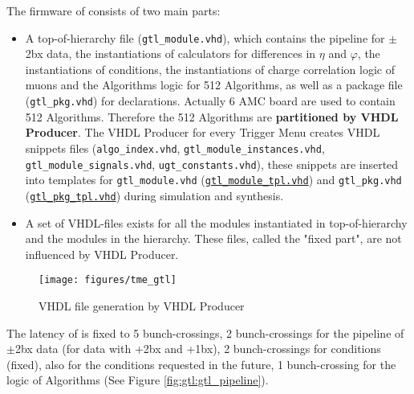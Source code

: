 The firmware of \ugtl consists of two main parts:
\begin{itemize}
\item A top-of-hierarchy file (\texttt{gtl\_module.vhd}), which contains the pipeline for $\pm$2bx data, the instantiations of calculators for differences in $\eta$ and $\varphi$, the instantiations of conditions, the instantiations of charge correlation logic of muons and the Algorithms logic for 512 Algorithms, as well as a package file (\texttt{gtl\_pkg.vhd}) for declarations. 
Actually 6 AMC board are used to contain 512 Algorithms. Therefore the 512 Algorithms are \textbf{partitioned by VHDL Producer}.
The VHDL Producer for every Trigger Menu creates VHDL snippets files (\texttt{algo\_index.vhd}, \texttt{gtl\_module\_instances.vhd}, \texttt{gtl\_module\_signals.vhd}, \texttt{ugt\_constants.vhd}), these snippets are inserted into templates for \texttt{gtl\_module.vhd} (\href{https://github.com/cms-l1-globaltrigger/mp7_ugt_legacy/tree/master/firmware/hdl/gt_mp7_core/gtl_fdl_wrapper/gtl/gtl_module_tpl.vhd}{\texttt{gtl\_module\_tpl.vhd}}) and \texttt{gtl\_pkg.vhd} (\href{https://github.com/cms-l1-globaltrigger/mp7_ugt_legacy/tree/master/firmware/hdl/gt_mp7_core/gtl_fdl_wrapper/gtl/gtl_pkg_tpl.vhd}{\texttt{gtl\_pkg\_tpl.vhd}}) during simulation and synthesis.
\item A set of VHDL-files exists for all the modules instantiated in top-of-hierarchy and the modules in the hierarchy. These files, called the "fixed part", are not influenced by VHDL Producer. 
\end{itemize}

\begin{figure}[htb]
\centering
\texttt{[image: figures/tme\_gtl]}
\caption{VHDL file generation by VHDL Producer} 
\label{fig:gtl:tme_gtl}
\end{figure}

The latency of \ugtl is fixed to 5 bunch-crossings,
2 bunch-crossings for the pipeline of $\pm$2bx data (for data with +2bx and +1bx), 2 bunch-crossings for conditions (fixed), also for the conditions requested in the future,
1 bunch-crossing for the logic of Algorithms (See Figure \ref{fig:gtl:gtl_pipeline}).\\


